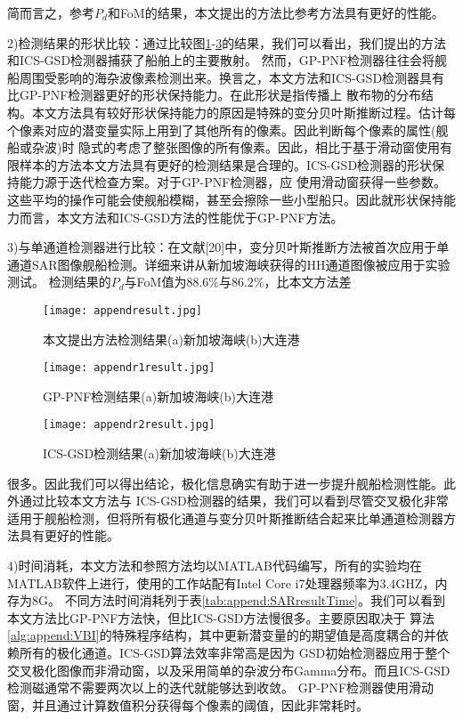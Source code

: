 简而言之，参考$P_d$和FoM的结果，本文提出的方法比参考方法具有更好的性能。

2)检测结果的形状比较：通过比较图\ref{fig:append:resultp}-\ref{fig:append:resultr2}的结果，我们可以看出，我们提出的方法和ICS-GSD检测器捕获了船舶上的主要散射。
然而，GP-PNF检测器往往会将舰船周围受影响的海杂波像素检测出来。换言之，本文方法和ICS-GSD检测器具有比GP-PNF检测器更好的形状保持能力。在此形状是指传播上
散布物的分布结构。本文方法具有较好形状保持能力的原因是特殊的变分贝叶斯推断过程。估计每个像素对应的潜变量实际上用到了其他所有的像素。因此判断每个像素的属性(舰船或杂波)时
隐式的考虑了整张图像的所有像素。因此，相比于基于滑动窗使用有限样本的方法本文方法具有更好的检测结果是合理的。ICS-GSD检测器的形状保持能力源于迭代检查方案。对于GP-PNF检测器，应
使用滑动窗获得一些参数。这些平均的操作可能会使舰船模糊，甚至会擦除一些小型船只。因此就形状保持能力而言，本文方法和ICS-GSD方法的性能优于GP-PNF方法。

3)与单通道检测器进行比较：在文献[20]中，变分贝叶斯推断方法被首次应用于单通道SAR图像舰船检测。详细来讲从新加坡海峡获得的HH通道图像被应用于实验测试。
检测结果的$P_d$与FoM值为$88.6\%$与$86.2\%$，比本文方法差
  \begin{figure}[H] %
    \centering
    \texttt{[image: appendresult.jpg]}
    \caption{本文提出方法检测结果(a)新加坡海峡(b)大连港}
    \label{fig:append:resultp}
  \end{figure}
  \begin{figure}[H] %
    \centering
    \texttt{[image: appendr1result.jpg]}
    \caption{GP-PNF检测结果(a)新加坡海峡(b)大连港}
    \label{fig:append:resultr1}
  \end{figure}
  \begin{figure}[H] %
    \centering
    \texttt{[image: appendr2result.jpg]}
    \caption{ICS-GSD检测结果(a)新加坡海峡(b)大连港}
    \label{fig:append:resultr2}
  \end{figure}
\noindent 很多。因此我们可以得出结论，极化信息确实有助于进一步提升舰船检测性能。此外通过比较本文方法与
ICS-GSD检测器的结果，我们可以看到尽管交叉极化非常适用于舰船检测，但将所有极化通道与变分贝叶斯推断结合起来比单通道检测器方法具有更好的性能。

4)时间消耗，本文方法和参照方法均以MATLAB代码编写，所有的实验均在MATLAB软件上进行，使用的工作站配有Intel Core i7处理器频率为3.4GHZ，内存为8G。
不同方法时间消耗列于表\ref{tab:append:SARresultTime}。我们可以看到本文方法比GP-PNF方法快，但比ICS-GSD方法慢很多。主要原因取决于
算法\ref{alg:append:VBI}的特殊程序结构，其中更新潜变量的的期望值是高度耦合的并依赖所有的极化通道。ICS-GSD算法效率非常高是因为
GSD初始检测器应用于整个交叉极化图像而非滑动窗，以及采用简单的杂波分布Gamma分布。而且ICS-GSD检测磁通常不需要两次以上的迭代就能够达到收敛。
GP-PNF检测器使用滑动窗，并且通过计算数值积分获得每个像素的阈值，因此非常耗时。

